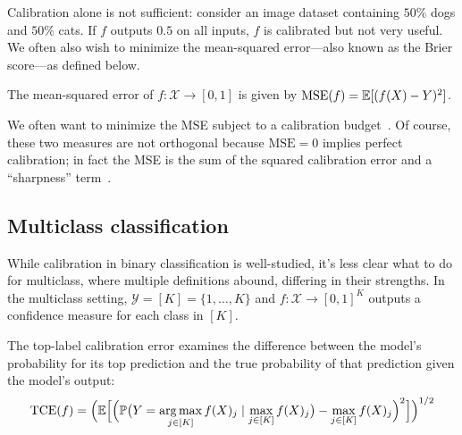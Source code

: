 

Calibration alone is not sufficient: consider an image dataset containing $50\%$ dogs and $50\%$ cats.
If $f$ outputs $0.5$ on all inputs, $f$ is calibrated but not very useful.
We often also wish to minimize the mean-squared error---also known as the Brier score---as defined below.

\begin{definition}
The mean-squared error of $f : \mathcal{X} \to [0, 1]$ is given by $\textup{MSE}(f) = \mathbb{E}[(f(X) - Y)^2]$.
\end{definition}

We often want to minimize the MSE subject to a calibration budget~\cite{gneiting2005weather, gneiting2007probabilistic}. Of course, these two measures are not orthogonal because $\mbox{MSE} = 0$ implies perfect calibration; in fact the MSE is the sum of the squared calibration error and a ``sharpness'' term~\cite{murphy1973vector,degroot1983forecasters, kuleshov2015calibrated}.

\subsection{Multiclass classification}

While calibration in binary classification is well-studied,
it's less clear what to do for multiclass, where multiple definitions abound, differing in their strengths. In the multiclass setting, $\mathcal{Y} = [K] = \{1, \dots, K\}$ and $f : \mathcal{X} \to [0, 1]^K$ outputs a confidence measure for each class in $[K]$.

\begin{definition}
The top-label calibration error examines the difference between the model's probability for its top prediction and the true probability of that prediction given the model's output:
\begin{align}
\textup{TCE}(f) = \Big( \mathbb{E}\Big[ \Big( \mathbb{P}\big(Y = \operatorname*{arg\,max}_{j \in [K]} f(X)_j \mid \max_{j \in [K]} f(X)_j\big) - \max_{j \in [K]} f(X)_j \Big)^2 \Big] \Big)^{1/2}
\end{align}
\end{definition}

